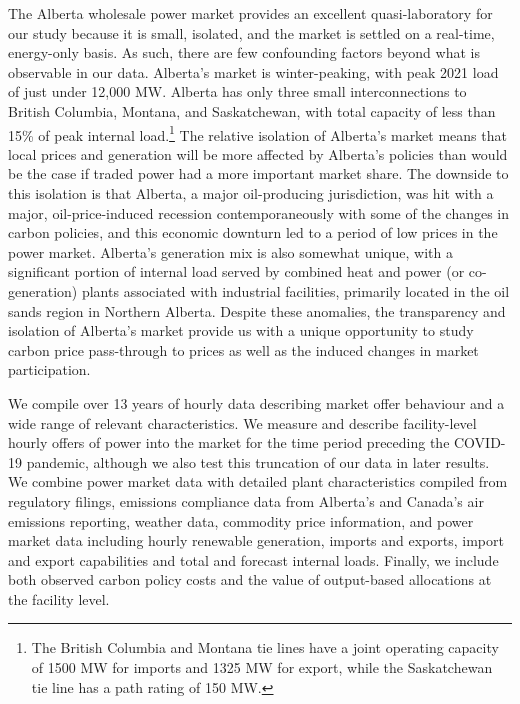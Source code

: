 \documentclass[12pt]{article}
\begin{document}
The Alberta wholesale power market provides an excellent quasi-laboratory for our study because it is small, isolated, and the market is settled on a real-time, energy-only basis. As such, there are few confounding factors beyond what is observable in our data. Alberta's market is winter-peaking, with peak 2021 load of just under 12,000 MW. Alberta has only three small interconnections to British Columbia, Montana, and Saskatchewan, with total capacity of less than 15\% of peak internal load.\footnote{The British Columbia and Montana tie lines have a joint operating capacity of 1500 MW for imports and 1325 MW for export, while the Saskatchewan tie line has a path rating of 150 MW.} The relative isolation of Alberta's market means that local prices and generation will be more affected by Alberta's policies than would be the case if traded power had a more important market share. The downside to this isolation is that Alberta, a major oil-producing jurisdiction, was hit with a major, oil-price-induced recession contemporaneously with some of the changes in carbon policies, and this economic downturn led to a period of low prices in the power market. Alberta's generation mix is also somewhat unique, with a significant portion of internal load served by combined heat and power (or co-generation) plants associated with industrial facilities, primarily located in the oil sands region in Northern Alberta. Despite these anomalies, the transparency and isolation of Alberta's market provide us with a unique opportunity to study carbon price pass-through to prices as well as the induced changes in market participation.

We compile over 13 years of hourly data describing market offer behaviour and a wide range of relevant characteristics. We measure and describe facility-level hourly offers of power into the market for the time period preceding the COVID-19 pandemic, although we also test this truncation of our data in later results. We combine power market data with detailed plant characteristics compiled from regulatory filings, emissions compliance data from Alberta's and Canada's air emissions reporting, weather data, commodity price information, and power market data including hourly renewable generation, imports and exports, import and export capabilities and total and forecast internal loads. Finally, we include both observed carbon policy costs and the value of output-based allocations at the facility level.
\end{document}
